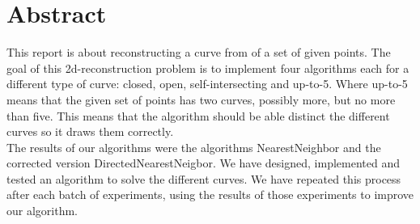 \chapter*{Abstract}
\label{cha:Abstract}
This report is about reconstructing a curve from of a set of given points. The goal of this 2d-reconstruction problem is to implement four algorithms each for a different type of curve: closed, open, self-intersecting and up-to-5. Where up-to-5 means that the given set of points has two curves, possibly more, but no more than five. This means that the algorithm should be able distinct the different curves so it draws them correctly.\\
The results of our algorithms were the algorithms NearestNeighbor and the corrected version DirectedNearestNeigbor. We have designed, implemented and tested an algorithm to solve the different curves. We have repeated this process after each batch of experiments, using the results of those experiments to improve our algorithm. \\
